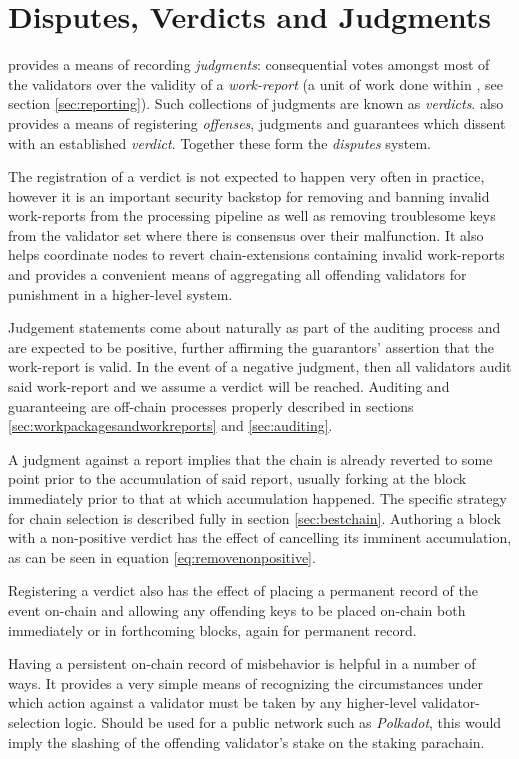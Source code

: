 \section{Disputes, Verdicts and Judgments}\label{sec:disputes}

\Jam provides a means of recording \emph{judgments}: consequential votes amongst most of the validators over the validity of a \emph{work-report} (a unit of work done within \Jam, see section \ref{sec:reporting}). Such collections of judgments are known as \emph{verdicts}. \Jam also provides a means of registering \emph{offenses}, judgments and guarantees which dissent with an established \emph{verdict}. Together these form the \emph{disputes} system.

The registration of a verdict is not expected to happen very often in practice, however it is an important security backstop for removing and banning invalid work-reports from the processing pipeline as well as removing troublesome keys from the validator set where there is consensus over their malfunction. It also helps coordinate nodes to revert chain-extensions containing invalid work-reports and provides a convenient means of aggregating all offending validators for punishment in a higher-level system.

Judgement statements come about naturally as part of the auditing process and are expected to be positive, further affirming the guarantors' assertion that the work-report is valid. In the event of a negative judgment, then all validators audit said work-report and we assume a verdict will be reached. Auditing and guaranteeing are off-chain processes properly described in sections \ref{sec:workpackagesandworkreports} and \ref{sec:auditing}.

A judgment against a report implies that the chain is already reverted to some point prior to the accumulation of said report, usually forking at the block immediately prior to that at which accumulation happened. The specific strategy for chain selection is described fully in section \ref{sec:bestchain}. Authoring a block with a non-positive verdict has the effect of cancelling its imminent accumulation, as can be seen in equation \ref{eq:removenonpositive}.

Registering a verdict also has the effect of placing a permanent record of the event on-chain and allowing any offending keys to be placed on-chain both immediately or in forthcoming blocks, again for permanent record.

Having a persistent on-chain record of misbehavior is helpful in a number of ways. It provides a very simple means of recognizing the circumstances under which action against a validator must be taken by any higher-level validator-selection logic. Should \Jam be used for a public network such as \emph{Polkadot}, this would imply the slashing of the offending validator's stake on the staking parachain.


